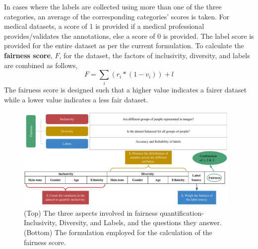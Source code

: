 \documentclass[journal]{IEEEtran}
\begin{document}
In cases where the labels are collected using more than one of the three categories, an average of the corresponding categories' scores is taken. For medical datasets, a score of 1 is provided if a medical professional provides/validates the annotations, else a score of 0 is provided. The label score is provided for the entire dataset as per the current formulation. To calculate the \textbf{fairness score}, $F$, for the dataset, the factors of inclusivity, diversity, and labels are combined as follows,
\begin{equation} \label{eq:fairnessquant}
    F = \sum_i{(r_i * (1 - v_i))} + l
\end{equation}
The fairness score is designed such that a higher value indicates a fairer dataset while a lower value indicates a less fair dataset.

\begin{figure}[]
\centering
\includegraphics[width = 0.97\textwidth]{images/FairnessQuantificationUpdated.pdf}
\caption{(Top) The three aspects involved in fairness quantification- Inclusivity, Diversity, and Labels, and the questions they answer. (Bottom) The formulation employed for the calculation of the fairness score.}
\label{fig:fairformula}
\end{figure}

\end{document}
